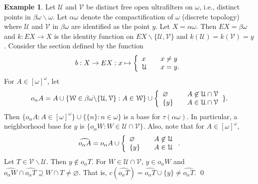 \documentclass[11pt]{amsart}
\theoremstyle{definition}
\newtheorem{example}[theorem]{Example}
\theoremstyle{remark}
\numberwithin{equation}{section}
\begin{document}
\begin{example}
Let ${\ensuremath{\mathcal{U}}}$ and ${\ensuremath{\mathcal{V}}}$ be distinct free open ultrafilters on $\omega$, i.e., distinct  points in $\beta\omega\backslash\omega$.  Let $\alpha\omega$ denote the compactification of $\omega$ (discrete topology) where ${\ensuremath{\mathcal{U}}}$ and ${\ensuremath{\mathcal{V}}}$ in $\beta\omega$ are identified as the point $y$.  Let $X = \alpha\omega$.  Then $EX  = \beta\omega$ and $k:EX \rightarrow X$ is the identity function on $EX\backslash \{{\ensuremath{\mathcal{{U,V}}}}\}$ and $k({\ensuremath{\mathcal{U}}}) = k({\ensuremath{\mathcal{V}}}) = y$. Consider the section defined by the function $$b:X \rightarrow EX:x \mapsto \left \{\begin{array}{l@{\quad \quad}l} x & x \ne y \\  \vspace{0mm} {\ensuremath{\mathcal{U}}} & x = y.\end{array} \right.$$ 
For $A \in [\omega]^{\omega}$, let 
$$o_{\alpha}A = A \cup \{{\ensuremath{\mathcal{W}}} \in \beta\omega\backslash \{{\ensuremath{\mathcal{{U,V}}}}\}: A \in {\ensuremath{\mathcal{W}}}\} \cup \left \{\begin{array}{l@{\quad \quad}l} \varnothing & A \not\in  {\ensuremath{\mathcal{U}}} \cap {\ensuremath{\mathcal{V}}} \\  \vspace{0mm} \{y\} & A \in  {\ensuremath{\mathcal{U}}} \cap {\ensuremath{\mathcal{V}}}\end {array}\right. \}.$$  
Then $\{o_{\alpha}A:A \in [\omega]^{\omega}\} \cup \{ \{n\}: n \in \omega \}$ is a base for $\tau(\alpha\omega)$. In particular, a neighborhood base for $y$ is $\{o_{\alpha}W:W \in {{\ensuremath{\mathcal{U}}}} \cap {{\ensuremath{\mathcal{V}}}}\}$.  Also, note that for $A \in [\omega]^{\omega}$, $$\widehat{o_{\alpha}A} =o_{\alpha}A \cup \left \{\begin{array}{l@{\quad \quad}l} \varnothing & A \not\in  {\ensuremath{\mathcal{U}}} \\  \vspace{0mm} \{y\} & A \in  {\ensuremath{\mathcal{U}}} \end {array}\right. .$$  Let $T \in {\ensuremath{\mathcal{V}}}\backslash {\ensuremath{\mathcal{U}}}$.  Then $y \not\in \widehat{o_{\alpha}T}$.  For $W \in {{\ensuremath{\mathcal{U}}}} \cap {{\ensuremath{\mathcal{V}}}}$,    $y \in o_{\alpha}W $ and $\widehat{o_{\alpha}W} \cap \widehat{o_{\alpha}T} \supseteq W \cap T \ne \varnothing$.  That is, $c(\widehat{o_{\alpha}T}) = \widehat{o_{\alpha}T} \cup \{y\} \ne \widehat{o_{\alpha}T}$. \qed
\end{example}
\end{document}
